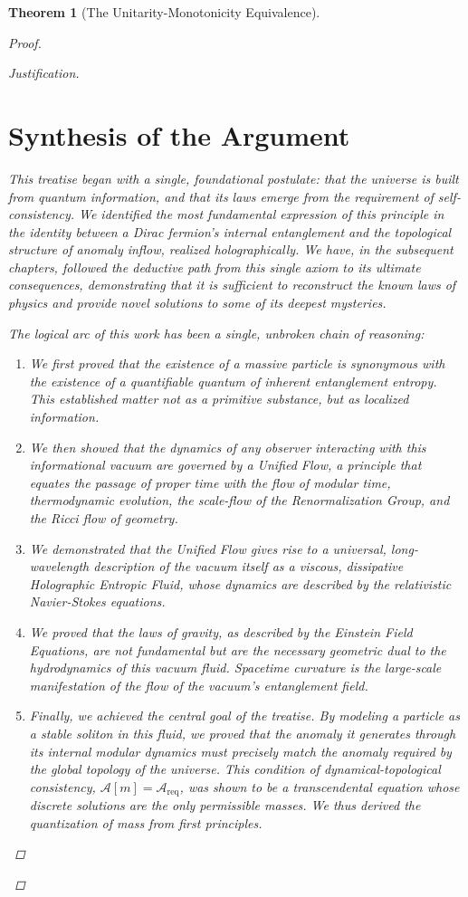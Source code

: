 \documentclass[11pt, letterpaper]{report}
\theoremstyle{plain} %
\newtheorem{theorem}{Theorem}[chapter]
\theoremstyle{definition} %
\theoremstyle{remark} %
\begin{document}
\begin{theorem}[The Unitarity-Monotonicity Equivalence]
\begin{proof}
\begin{proof}[Justification]
\section{Synthesis of the Argument}

This treatise began with a single, foundational postulate: that the universe is built from quantum information, and that its laws emerge from the requirement of self-consistency. We identified the most fundamental expression of this principle in the identity between a Dirac fermion's internal entanglement and the topological structure of anomaly inflow, realized holographically. We have, in the subsequent chapters, followed the deductive path from this single axiom to its ultimate consequences, demonstrating that it is sufficient to reconstruct the known laws of physics and provide novel solutions to some of its deepest mysteries.

The logical arc of this work has been a single, unbroken chain of reasoning:
\begin{enumerate}
    \item We first proved that the existence of a massive particle is synonymous with the existence of a quantifiable quantum of inherent entanglement entropy. This established matter not as a primitive substance, but as localized information.
    \item We then showed that the dynamics of any observer interacting with this informational vacuum are governed by a Unified Flow, a principle that equates the passage of proper time with the flow of modular time, thermodynamic evolution, the scale-flow of the Renormalization Group, and the Ricci flow of geometry.
    \item We demonstrated that the Unified Flow gives rise to a universal, long-wavelength description of the vacuum itself as a viscous, dissipative Holographic Entropic Fluid, whose dynamics are described by the relativistic Navier-Stokes equations.
    \item We proved that the laws of gravity, as described by the Einstein Field Equations, are not fundamental but are the necessary geometric dual to the hydrodynamics of this vacuum fluid. Spacetime curvature is the large-scale manifestation of the flow of the vacuum's entanglement field.
    \item Finally, we achieved the central goal of the treatise. By modeling a particle as a stable soliton in this fluid, we proved that the anomaly it generates through its internal modular dynamics must precisely match the anomaly required by the global topology of the universe. This condition of dynamical-topological consistency, $\mathcal{A}[m]=\mathcal{A}_{\text{req}}$, was shown to be a transcendental equation whose discrete solutions are the only permissible masses. We thus derived the quantization of mass from first principles.
\end{enumerate}


\end{proof}
\end{proof}
\end{theorem}
\end{document}
